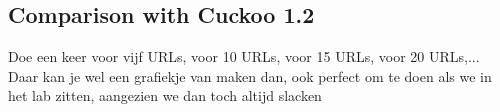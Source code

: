 \restoregeometry
\subsection{Comparison with Cuckoo 1.2}

Doe een keer voor vijf URLs, voor 10 URLs, voor 15 URLs, voor 20 URLs,...
Daar kan je wel een grafiekje van maken dan, ook perfect om te doen
als we in het lab zitten, aangezien we dan toch altijd slacken

